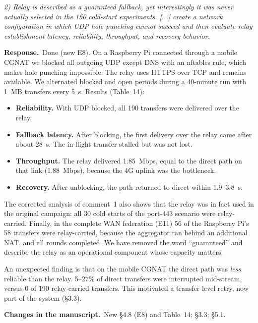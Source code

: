 \documentclass[11pt,a4paper]{article}
\newenvironment{comment}{\par\medskip\noindent\begin{minipage}{\linewidth}\color{blue!45!black}\itshape}{\end{minipage}\par}
\newcommand{\reply}{\par\smallskip\noindent\textbf{Response.}~}
\newcommand{\changes}{\par\smallskip\noindent\textbf{Changes in the manuscript.}~}
\begin{document}
\begin{comment}
2) Relay is described as a guaranteed fallback, yet interestingly it was never actually selected in the 150 cold-start experiments. [...] create a network configuration in which UDP hole-punching cannot succeed and then evaluate relay establishment latency, reliability, throughput, and recovery behavior.
\end{comment}
\reply Done (new E8). On a Raspberry Pi connected through a mobile CGNAT we blocked all outgoing UDP except DNS with an nftables rule, which makes hole punching impossible. The relay uses HTTPS over TCP and remains available. We alternated blocked and open periods during a 40-minute run with 1~MB transfers every 5~s. Results (Table~14):
\begin{itemize}[leftmargin=1.3em,itemsep=0.1em]
\item \textbf{Reliability.} With UDP blocked, all 190 transfers were delivered over the relay.
\item \textbf{Fallback latency.} After blocking, the first delivery over the relay came after about 28~s. The in-flight transfer stalled but was not lost.
\item \textbf{Throughput.} The relay delivered 1.85~Mbps, equal to the direct path on that link (1.88~Mbps), because the 4G uplink was the bottleneck.
\item \textbf{Recovery.} After unblocking, the path returned to direct within 1.9--3.8~s.
\end{itemize}
The corrected analysis of comment~1 also shows that the relay was in fact used in the original campaign: all 30 cold starts of the port-443 scenario were relay-carried. Finally, in the complete WAN federation (E11) 56 of the Raspberry Pi's 58 transfers were relay-carried, because the aggregator ran behind an additional NAT, and all rounds completed. We have removed the word ``guaranteed'' and describe the relay as an operational component whose capacity matters.

An unexpected finding is that on the mobile CGNAT the direct path was \emph{less} reliable than the relay. 5--27\% of direct transfers were interrupted mid-stream, versus 0 of 190 relay-carried transfers. This motivated a transfer-level retry, now part of the system (\S3.3).

\changes New \S4.8 (E8) and Table~14; \S3.3; \S5.1.
\end{document}
